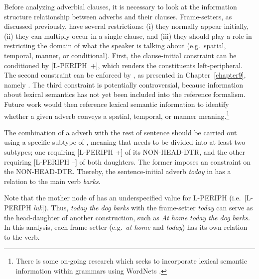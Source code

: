 Before analyzing adverbial clauses, it is
necessary to look at the information structure relationship between
adverbs and their clauses. Frame-setters, as
discussed previously, have several restrictions: (i) they normally
appear initially, (ii) they can multiply occur in a single clause, and
(iii) they should play a role in restricting the domain of what the
speaker is talking about (e.g.\ spatial, temporal, manner, or
conditional). First, the clause-initial constraint
can be conditioned by \mbox{[L-PERIPH +]}, which renders the
constituents left-peripheral. The second constraint can
be enforced by , as presented in
Chapter~\ref{chapter9}, namely  \vs
{}. The third constraint is
potentially controversial, because information about lexical semantics
has not yet been included into the  reference
formalism. Future work would then reference lexical semantic
information to identify whether a given adverb conveys a spatial,
temporal, or manner meaning.\footnote{There is some on-going research
  which seeks to incorporate lexical semantic information within
   grammars using WordNets
  \citep{bond:etal:09,pozen:13}.}




The combination of a  adverb with the rest of
sentence should be carried out using a specific subtype of
, meaning that  needs to be
divided into at least two subtypes; one requiring [L-PERIPH +] of its
NON-HEAD-DTR, and the other requiring [L-PERIPH --] of both
daughters. The former imposes an 
constraint on the NON-HEAD-DTR. Thereby, the sentence-initial adverb
\textit{today} in  has a  relation
to the main verb \textit{barks}.







\noindent Note that the mother node of  has an
underspecified value for L-PERIPH (i.e.\ [L-PERIPH
  \textit{luk}]). Thus, \textit{today the dog barks} with the
frame-setter \textit{today} can serve as the head-daughter of another
 construction, such as \textit{At home today the
  dog barks.} In this analysis, each frame-setter (e.g.\ \textit{at
  home} and \textit{today}) has its own  relation to the
verb.


